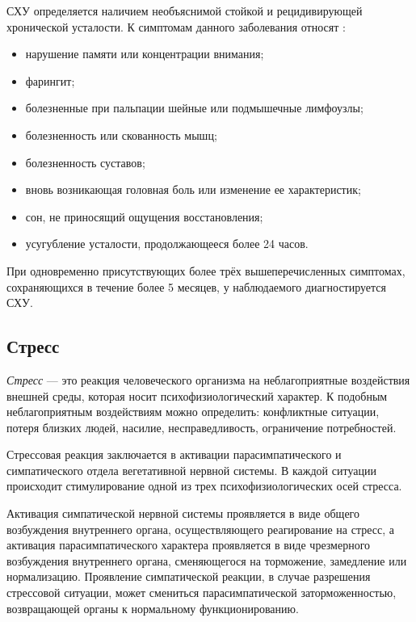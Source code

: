 СХУ определяется наличием необъяснимой стойкой и рецидивирующей хронической усталости. К симптомам данного заболевания относят \cite{syndromOfChrono}:
\begin{itemize}[leftmargin=1.6\parindent]
\item нарушение памяти или концентрации внимания;
\item фарингит;
\item болезненные при пальпации шейные или подмышечные лимфоузлы;
\item болезненность или скованность мышц;
\item болезненность суставов;
\item вновь возникающая головная боль или изменение ее характеристик;
\item сон, не приносящий ощущения восстановления;
\item усугубление усталости, продолжающееся более 24 часов.
\end{itemize}

При одновременно присутствующих более трёх вышеперечисленных симптомах, сохраняющихся в течение более 5 месяцев, у наблюдаемого диагностируется СХУ. \cite{syndromOfChrono}


\subsection{Стресс}
\textit{Стресс} --- это реакция человеческого организма на неблагоприятные воздействия внешней среды, которая носит психофизиологический характер. К подобным неблагоприятным воздействиям можно определить: конфликтные ситуации, потеря близких людей, насилие, несправедливость, ограничение потребностей. \cite{neuroPhysicalMechasmsOfStress}

Стрессовая реакция заключается в активации парасимпатического и симпатического отдела вегетативной нервной системы. В каждой ситуации происходит стимулирование одной из трех психофизиологических осей стресса. \cite{neuroPhysicalMechasmsOfStress}

Активация симпатической нервной системы проявляется в виде общего возбуждения внутреннего органа, осуществляющего реагирование на стресс, а активация парасимпатического характера проявляется в виде чрезмерного возбуждения внутреннего органа, сменяющегося на торможение, замедление или нормализацию. Проявление симпатической реакции, в случае разрешения стрессовой ситуации, может смениться парасимпатической заторможенностью, возвращающей органы к нормальному функционированию. \cite{neuroPhysicalMechasmsOfStress}

